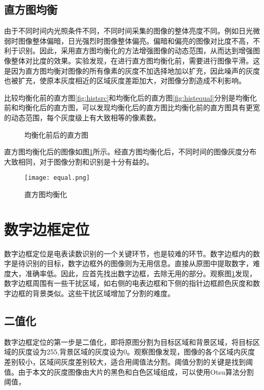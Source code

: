 \subsection{直方图均衡}


由于不同时间内光照条件不同，不同时间采集的图像的整体亮度不同。例如日光微弱时图像整体偏暗，日光强烈时图像整体偏亮。偏暗和偏亮的图像对比度不高，不利于识别。因此，采用直方图均衡化的方法增强图像的动态范围，从而达到增强图像整体对比度的效果。实验发现，在进行直方图均衡化前，需要进行图像平滑。这是因为直方图均衡对图像的所有像素的灰度不加选择地加以扩充，因此噪声的灰度也被扩充，使原本灰度相近的区域灰度差距加大，对图像分割造成不利影响。

比较均衡化前的直方图\ref{fig:histsrc}和均衡化后的直方图\ref{fig:histequal}分别是均衡化前和均衡化后的直方图，可以发现均衡化后的直方图比均衡化前的直方图具有更宽的动态范围，每个灰度级上有大致相等的像素数。
\begin{figure}[h]
  \centering
  \caption{均衡化前后的直方图}
\end{figure}
直方图均衡化后的图像如图\ref{fig:equal}所示。经直方图均衡化后，不同时间的图像灰度分布大致相同，对于图像分割和识别是十分有益的。
\begin{figure}[h]
  \centering
  \texttt{[image: equal.png]}
  \caption{直方图均衡化}
  \label{fig:equal}
\end{figure}



\section{数字边框定位}

数字边框定位是电表读数识别的一个关键环节，也是较难的环节。数字边框内的数字是待识别的目标，数字边框外的图像则为无用信息。直接从原图中提取数字，难度大，准确率低。因此，应首先找出数字边框，去除无用的部分。观察图\ref{fig:equal}发现，数字边框周围有一些干扰区域，如右侧的电表边框和下侧的指针边框颜色灰度和数字边框的背景类似。这些干扰区域增加了分割的难度。

\subsection{二值化}

数字边框定位的第一步是二值化，即将原图分割为目标区域和背景区域，将目标区域的灰度设为255,背景区域的灰度设为0。观察图像发现，图像的各个区域内灰度差别较小，区域间灰度差别较大，适合用阈值法分割。阈值分割的关键是找到阈值。由于本文的灰度图像由大片的黑色和白色区域组成，可以使用Otsu算法分割阈值，

